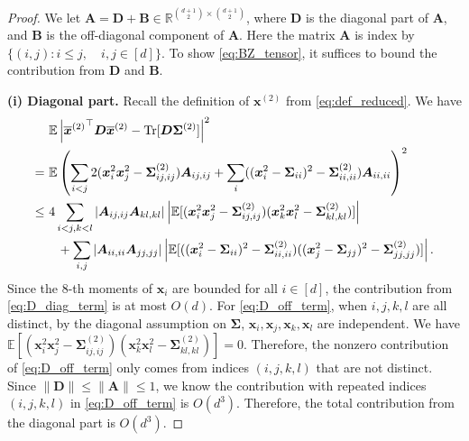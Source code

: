 \documentclass[10pt,a4paper]{amsart}
\newcommand{\E}{\mathbb{E}}
\newcommand{\Tr}{\operatorname{Tr}}
\def\bA{{\boldsymbol A}}
\def\bB{{\boldsymbol B}}
\def\bD{{\boldsymbol D}}
\def\bSigma{{\boldsymbol \Sigma}}
\def\bx{{\boldsymbol x}}
\begin{document}
\begin{proof}
     We let $\bA=\bD+\bB \in \mathbb R^{\binom{d+1}{2}\times \binom{d+1}{2}}$, where $\bD$ is the diagonal part of $\bA$, and $\bB$ is the off-diagonal component of $\bA$.  Here the matrix $\bA$ is index by $\{(i,j): i\leq j, \quad i,j\in [d] \}$.
      To show \eqref{eq:BZ_tensor}, it suffices to bound the contribution from $\bD$ and $\bB$.



\textbf{ (i) Diagonal part.} Recall the definition of $\bx^{(2)}$ from \eqref{eq:def_reduced}. We have
\begin{align}
    &\E\left| {\overline\bx^{(2)}}^\top \bD\overline\bx^{(2)}-\Tr[\bD\bSigma^{(2)}]\right|^2\\
    =~&\E \left( \sum_{i<j}2(\bx_i^2 \bx_j^2-\bSigma_{ij,ij}^{(2)})\bA_{ij,ij} +\sum_{i} ((\bx_i^2-\bSigma_{ii})^2-\bSigma_{ii,ii}^{(2)}) \bA_{ii,ii}\right)^2 \notag \\
     \leq~& 4\sum_{i<j,k< l}|\bA_{ij,ij}\bA_{kl,kl}|\left|\E[ (\bx_{i}
    ^2\bx_j^2-\bSigma_{ij,ij}^{(2)})(\bx_{k}^2\bx_{l}^2-\bSigma_{kl,kl}^{(2)})]\right|\label{eq:D_off_term}\\
     &~~+\sum_{i,j} |\bA_{ii,ii}\bA_{jj,jj}| \left|\E[((\bx_i^2-\bSigma_{ii})^2-\bSigma_{ii,ii}^{(2)})((\bx_j^2-\bSigma_{jj})^2-\bSigma_{jj,jj}^{(2)})]\right|. \label{eq:D_diag_term}
\end{align}
    Since the $8$-th moments of $\bx_i$ are bounded for all $i\in [d]$, the contribution from \eqref{eq:D_diag_term} is at most $O(d)$. For \eqref{eq:D_off_term}, when $i,j,k,l$ are all distinct, by the diagonal assumption on $\bSigma$, $\bx_i,\bx_j,\bx_k,\bx_l$ are independent. We have
    $\E[ (\bx_{i}
    ^2\bx_j^2-\bSigma_{ij,ij}^{(2)})(\bx_{k}^2\bx_{l}^2-\bSigma_{kl,kl}^{(2)})]=0$.
Therefore, the nonzero contribution of \eqref{eq:D_off_term} only comes from indices $(i,j,k,l)$ that are not distinct. Since $\|\bD\|\leq \|\bA\|\leq 1$, we know the contribution with repeated indices  $(i,j,k,l)$ in \eqref{eq:D_off_term} is $O(d^3)$. Therefore, the total contribution from the diagonal part is $O(d^3)$.



\end{proof}
\end{document}

